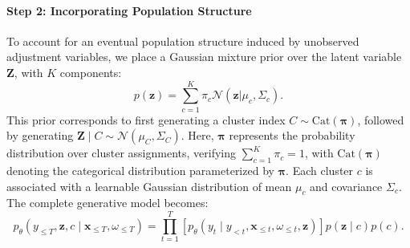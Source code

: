 \documentclass[10pt]{article} %
\begin{document}
\paragraph{Step 2: Incorporating Population Structure} To account for an eventual population structure induced by unobserved adjustment variables, we place a Gaussian mixture prior over the latent variable \(\mathbf{Z}\), with \(K\) components:
\begin{equation} 
\label{eq:prior_Z_gmm}
p(\mathbf{z}) = \sum_{c=1}^{K} \pi_{c} \mathcal{N}(\mathbf{z}|\mu_c, \Sigma_c).
\end{equation}
This prior corresponds to first generating a cluster index \(C \sim \mathrm{Cat}(\mathbf{\pi})\), followed by generating \(\mathbf{Z} \mid C \sim \mathcal{N}(\mu_C, \Sigma_C)\). Here, \(\mathbf{\pi}\) represents the probability distribution over cluster assignments, verifying \(\sum_{c=1}^K \pi_{c} = 1\), with \(\mathrm{Cat}(\mathbf{\pi})\) denoting the categorical distribution parameterized by \(\mathbf{\pi}\). Each cluster \(c\) is associated with a learnable Gaussian distribution of mean \(\mu_c\) and covariance \(\Sigma_c\). The complete generative model becomes:
\begin{equation}
\label{eq:gen_model_complete}
p_{\theta}(y_{\leq T}, \mathbf{z}, c \mid \mathbf{x}_{\leq T}, \omega_{\leq T}) = \prod_{t=1}^{T} \left[ p_{\theta}(y_{t} \mid y_{<t}, \mathbf{x}_{\leq t}, \omega_{\leq t}, \mathbf{z}) \right] p(\mathbf{z} \mid c) p(c).
\end{equation}
\end{document}

